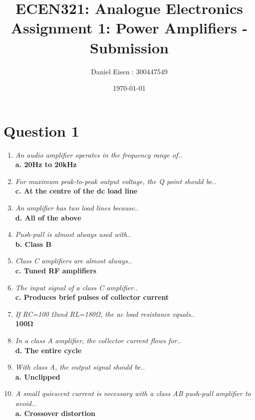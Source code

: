 \documentclass[11pt]{article}
\title{ECEN321: Analogue Electronics \\ Assignment 1: Power Amplifiers - Submission}
\author{Daniel Eisen : 300447549}
\date{\today}
\begin{document}
\maketitle
\section*{Question 1}
  \begin{enumerate}[label = \Roman*.]
          \item \textit{An audio amplifier operates in the frequency range of..} \\ 
          \textbf{a. 20Hz to 20kHz} 

          \item \textit{For maximum peak-to-peak output voltage, the Q point should be..} \\ 
          \textbf{c. At the centre of the dc load line}
          
          \item \textit{An amplifier has two load lines because..} \\ 
          \textbf{d. All of the above} 
          
          \item \textit{Push-pull is almost always used with..} \\ 
          \textbf{b. Class B} 
          
          \item \textit{Class C amplifiers are almost always..} \\ 
          \textbf{c. Tuned RF amplifiers} 
          
          \item \textit{The input signal of a class C amplifier..} \\ 
          \textbf{c. Produces brief pulses of collector current} 
          
          \item \textit{If RC=100 Ωand RL=180Ω, the ac load resistance equals..} \\ 
          \textbf{100Ω} 
          
          \item \textit{In a class A amplifier, the collector current flows for..} \\ 
          \textbf{d. The entire cycle} 
          
          \item \textit{With class A, the output signal should be..} \\ 
          \textbf{a. Unclipped} 
          
          \item \textit{A small quiescent current is necessary with a class AB push-pull amplifier to avoid..} \\ 
          \textbf{a. Crossover distortion} 
  \end{enumerate}
\end{document}
